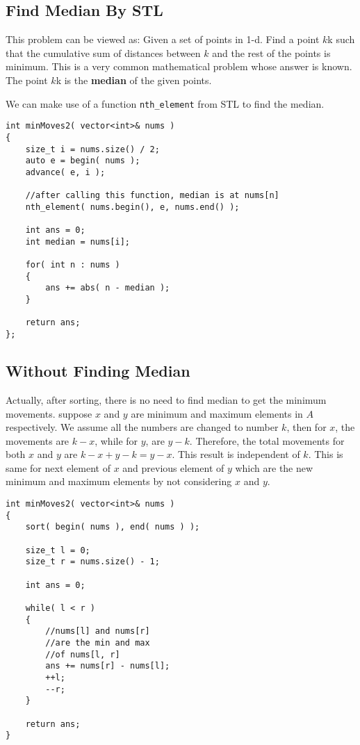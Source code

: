\subsection{Find Median By STL}
This problem can be viewed as: Given a set of points in 1-d. Find a point $k$k such that the cumulative sum of distances between $k$ and the rest of the points is minimum. This is a very common mathematical problem whose answer is known. The point $k$k is the \textbf{median} of the given points.

We can make use of a function \lstinline[language=C++, basicstyle=\small\ttfamily, keywordstyle=\bfseries\color{green!40!black}]|nth_element| from STL to find the median.

\begin{lstlisting}[style=customc, caption={Find Median By STL}]
int minMoves2( vector<int>& nums )
{
    size_t i = nums.size() / 2;
    auto e = begin( nums );
    advance( e, i );

    //after calling this function, median is at nums[n]
    nth_element( nums.begin(), e, nums.end() );

    int ans = 0;
    int median = nums[i];

    for( int n : nums )
    {
        ans += abs( n - median );
    }

    return ans;
};
\end{lstlisting}

\subsection{Without Finding Median}
Actually, after sorting, there is no need to find median to get the minimum movements. suppose $x$ and $y$ are minimum and maximum elements in $A$ respectively. We assume all the numbers are changed to number $k$, then for $x$, the movements are $k-x$, while for $y$, are $y-k$. Therefore, the total movements for both $x$ and $y$ are $k-x+y-k= y-x$. This result is independent of $k$. This is same for next element of $x$ and previous element of $y$ which are the new minimum and maximum elements by not considering $x$ and $y$.

\begin{lstlisting}[style=customc, caption={Without Finding Median}]
int minMoves2( vector<int>& nums )
{
    sort( begin( nums ), end( nums ) );

    size_t l = 0;
    size_t r = nums.size() - 1;

    int ans = 0;

    while( l < r )
    {
        //nums[l] and nums[r]
        //are the min and max
        //of nums[l, r]
        ans += nums[r] - nums[l];
        ++l;
        --r;
    }

    return ans;
}
\end{lstlisting}

